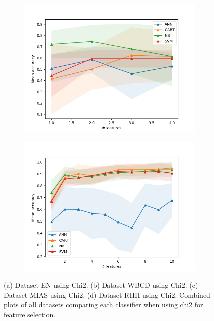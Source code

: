 \begin{figure}[htbp]
  \begin{subfigure}[b]{0.475\textwidth}
      \centering
      \includegraphics[width=\textwidth]{../plots_with_std_fill/Data_mias_chi2_combined.png}
      \caption[]%
      {{\small}}
      \label{fig:MIAS_chi2}
  \end{subfigure}
  \quad
  \begin{subfigure}[b]{0.475\textwidth}
      \centering
      \includegraphics[width=\textwidth]{../plots_with_std_fill/FNA_gb_chi2_combined.png}
      \caption[]%
      {{\small}}
      \label{fig:RHH_chi2}
  \end{subfigure}
  \caption[]
  {\small (a) Dataset EN using Chi2. (b) Dataset WBCD using Chi2. (c) Dataset MIAS using Chi2. (d) Dataset RHH using Chi2.  Combined plots of all datasets comparing each classifier when using chi2 for feature selection.}
  \label{fig:plots_chi2}
\end{figure}
